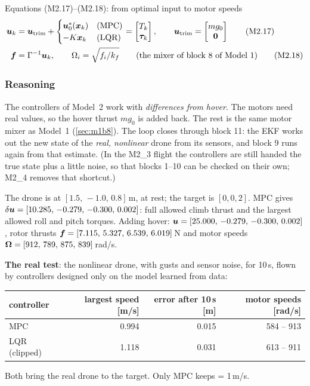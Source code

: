 \begin{eqbox}{Equations (M2.17)--(M2.18): from optimal input to motor speeds}
\begin{align}
  \bm{u}_k&=\bm{u}_{\text{trim}}+\begin{cases}\bm{u}_0^*(\bm{x}_k)&\text{(MPC)}\\ -K\bm{x}_k&\text{(LQR)}\end{cases}
   =\begin{bmatrix}T_k\\ \bm{\tau}_k\end{bmatrix},\qquad \bm{u}_{\text{trim}}=\begin{bmatrix}mg_0\\ \bm0\end{bmatrix} \tag{M2.17}\\
  \bm{f}&=\Gamma^{-1}\bm{u}_k,\qquad \Omega_i=\sqrt{f_i/k_f}\qquad(\text{the mixer of block 8 of Model 1}) \tag{M2.18}
\end{align}
\end{eqbox}

\subsubsection*{Reasoning}
The controllers of Model~2 work with \emph{differences from hover}. The motors need real values, so the hover thrust
$mg_0$ is added back. The rest is the same motor mixer as Model~1 (\cref{sec:m1b8}). The loop closes through block 11:
the EKF works out the new state of the \emph{real, nonlinear} drone from its sensors, and block 9 runs again from that
estimate. (In the M2\_3 flight the controllers are still handed the true state plus a little noise, so that blocks 1--10
can be checked on their own; M2\_4 removes that shortcut.)

\begin{toy}
The drone is at $[1.5,\,-1.0,\,0.8]$\,m, at rest; the target is $[0,0,2]$. MPC gives
$\delta\bm{u}=[10.285,\,-0.279,\,-0.300,\,0.002]$: full allowed climb thrust and the largest allowed roll and pitch torques. Adding
hover: $\bm{u}=[25.000,\,-0.279,\,-0.300,\,0.002]$, rotor thrusts $\bm{f}=[7.115,\,5.327,\,6.539,\,6.019]$\,N and motor speeds
$\bm{\Omega}=[912,\,789,\,875,\,839]$\,rad/s.

\textbf{The real test}: the nonlinear drone, with gusts and sensor noise, for 10\,s, flown by controllers designed only on
the model learned from data:
\begin{center}\small
\begin{tabular}{lrrr}
\toprule
controller & largest speed [m/s] & error after 10\,s [m] & motor speeds [rad/s]\\
\midrule
MPC & 0.994 & 0.015 & 584 -- 913\\
LQR (clipped) & 1.118 & 0.031 & 613 -- 911\\
\bottomrule
\end{tabular}
\end{center}
Both bring the real drone to the target. Only MPC keeps  = 1\,m/s.
\end{toy}

